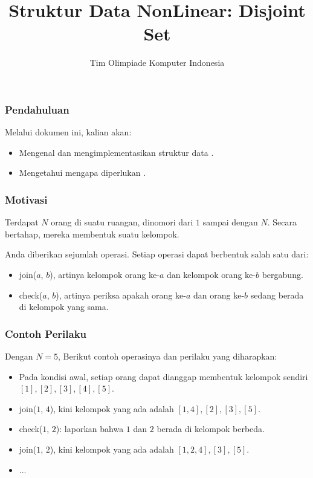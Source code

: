 

\title{Struktur Data NonLinear: \newline Disjoint Set}
\author{Tim Olimpiade Komputer Indonesia}
\date{}



\begin{frame}
\titlepage
\end{frame}

\begin{frame}
\frametitle{Pendahuluan}
Melalui dokumen ini, kalian akan:
\begin{itemize}
  \item Mengenal dan mengimplementasikan struktur data \pdjs.
  \item Mengetahui mengapa diperlukan \pdjs.
\end{itemize}
\end{frame}

\begin{frame}
\frametitle{Motivasi}
Terdapat $N$ orang di suatu ruangan, dinomori dari $1$ sampai dengan $N$. Secara bertahap, mereka membentuk suatu kelompok.\newline

Anda diberikan sejumlah operasi. Setiap operasi dapat berbentuk salah satu dari:
\begin{itemize}
  \item join($a$, $b$), artinya kelompok orang ke-$a$ dan kelompok orang ke-$b$ bergabung.
  \item check($a$, $b$), artinya periksa apakah orang ke-$a$ dan orang ke-$b$ sedang berada di kelompok yang sama.
\end{itemize}
\end{frame}

\begin{frame}
\frametitle{Contoh Perilaku}
Dengan $N=5$, Berikut contoh operasinya dan perilaku yang diharapkan:
\begin{itemize}
  \item Pada kondisi awal, setiap orang dapat dianggap membentuk kelompok sendiri $[1], [2], [3], [4], [5]$.
  \item join($1$, $4$), kini kelompok yang ada adalah $[1, 4], [2], [3], [5]$.
  \item check($1$, $2$): laporkan bahwa $1$ dan $2$ berada di kelompok berbeda.
  \item join($1$, $2$), kini kelompok yang ada adalah $[1, 2, 4], [3], [5]$.
  \item ...
\end{itemize}
\end{frame}

